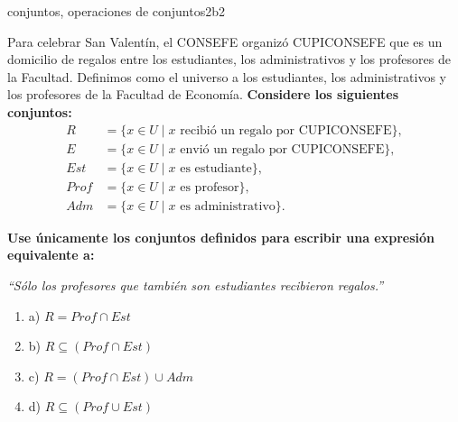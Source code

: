 \documentclass{article}
\begin{document}
\begin{question}{17}{conjuntos, operaciones de conjuntos}{2}{b}{2}{
Para celebrar San Valentín, el CONSEFE organizó CUPICONSEFE que es un domicilio de regalos entre los estudiantes, los administrativos y los profesores de la Facultad. Definimos como el universo a los estudiantes, los administrativos y los profesores de la Facultad de Economía. \textbf{Considere los siguientes conjuntos:}
\[
\begin{aligned}
R &= \{x \in U \mid x \text{ recibió un regalo por CUPICONSEFE}\},\\
E &= \{x \in U \mid x \text{ envió un regalo por CUPICONSEFE}\},\\
Est &= \{x \in U \mid x \text{ es estudiante}\},\\
Prof &= \{x \in U \mid x \text{ es profesor}\},\\
Adm &= \{x \in U \mid x \text{ es administrativo}\}.
\end{aligned}
\]

\textbf{Use únicamente los conjuntos definidos para escribir una expresión equivalente a:} \medskip

\textit{“Sólo los profesores que también son estudiantes recibieron regalos.”} \medskip

\begin{enumerate}
    \item a) \( R = Prof \cap Est \)  
    \item b) \( R \subseteq (Prof \cap Est) \)  
    \item c) \( R = (Prof \cap Est) \cup Adm \)  
    \item d) \( R \subseteq (Prof \cup Est) \)  
\end{enumerate}
}
\end{question}
\end{document}
